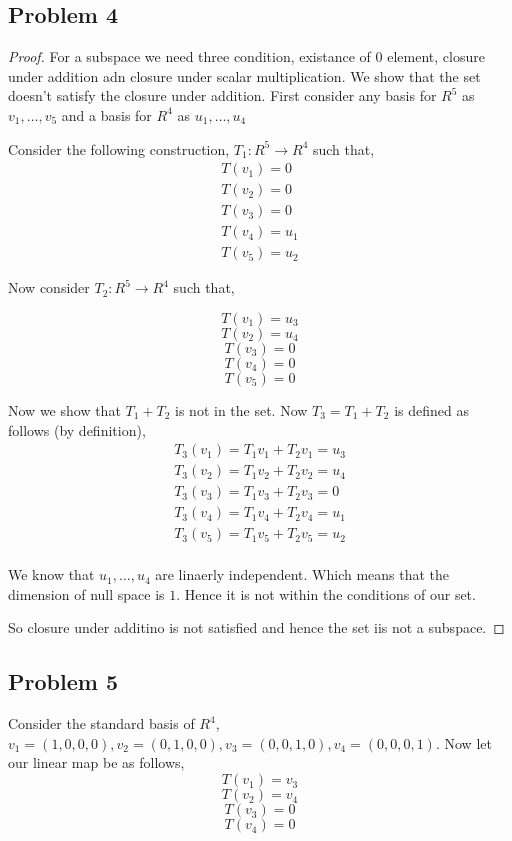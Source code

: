 \documentclass[a4paper]{report}
\begin{document}
\subsection*{Problem 4}
\begin{proof}
    For a subspace we need three condition, existance of $0$ element, closure under addition adn closure under scalar multiplication. We show that the set doesn't satisfy the closure under addition. First consider any basis for $R^{5}$ as $v_1,\dots,v_5$ and a basis for $R^{4}$ as $u_1,\dots,u_4$

    Consider the following construction, $T_1: R^{5}\rightarrow R^{4}$  such that, 
    \begin{align*}
       T(v_1) = 0\\
       T(v_2) = 0\\
       T(v_3) = 0\\
       T(v_4) = u_1\\
       T(v_5) = u_2
    \end{align*}

    Now consider $T_2: R^{5}\rightarrow R^{4}$ such that, 

    $$ T(v_1) = u_3 $$ 
    $$ T(v_2) = u_4 $$ 
    $$ T(v_3) = 0 $$ 
    $$ T(v_4) = 0 $$ 
    $$ T(v_5) = 0 $$ 

    Now we show that $T_1 + T_2$ is not in the set. Now $T_3 = T_1 + T_2$ is defined as follows (by definition), 
    \begin{align*}
    T_3(v_1) = T_1v_1 + T_2v_1 = u_3 \\
    T_3(v_2) = T_1v_2 + T_2v_2 = u_4 \\
    T_3(v_3) = T_1v_3 + T_2v_3 = 0 \\
    T_3(v_4) = T_1v_4 + T_2v_4 = u_1 \\
    T_3(v_5) = T_1v_5 + T_2v_5 = u_2 \\
    \end{align*}

    We know that $u_1,\dots,u_4$ are linaerly independent. Which means that  the dimension of null space is $1$. Hence it is not within the conditions of our set.

    So closure under additino is not satisfied and hence the set iis not a subspace.
\end{proof}

\subsection*{Problem 5}
Consider the standard basis of $R^{4}$, $v_1 = (1,0,0,0), v_2 = (0,1,0,0), v_3 = (0,0,1,0), v_4 = (0,0,0,1)$. Now let our linear map be as follows, 
$$ T(v_1) = v_3 $$ 
$$ T(v_2) = v_4 $$ 
$$ T(v_3) = 0 $$ 
$$ T(v_4) = 0 $$ 
\end{document}
